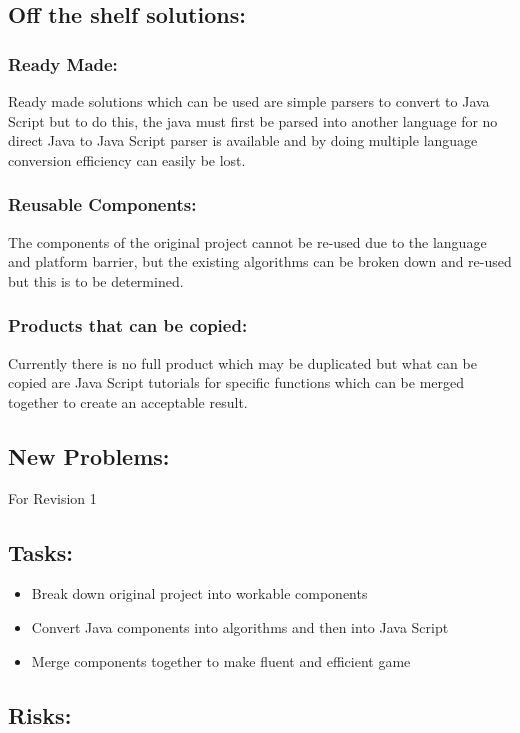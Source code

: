 \documentclass{article}
\begin{document}
\subsection{Off the shelf solutions:}
\subsubsection{Ready Made:}
Ready made solutions which can be used are simple parsers to convert to Java
Script but to do this, the java must first be parsed into another language for
no direct Java to Java Script parser is available and by doing multiple language
conversion efficiency can easily be lost.

\subsubsection{Reusable Components:}

The components of the original project cannot be re-used due to the language and
platform barrier, but the existing algorithms can be broken down and re-used but
this is to be determined.

\subsubsection{Products that can be copied:}

Currently there is no full product which may be duplicated but what can be
copied are Java Script tutorials for specific functions which can be merged
together to create an acceptable result.

\subsection{New Problems:}
For Revision 1
\subsection{Tasks:}
\begin{itemize}
\item Break down original project into workable components
\item Convert Java components into algorithms and then into Java Script
\item Merge components together to make fluent and efficient game
\end{itemize}
\subsection{Risks:}
\end{document}

